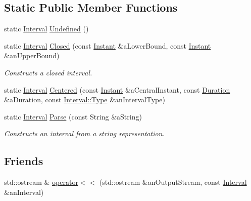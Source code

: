 \subsection*{Static Public Member Functions}
\begin{DoxyCompactItemize}
\item 
static \hyperlink{classostk_1_1physics_1_1time_1_1_interval}{Interval} \hyperlink{classostk_1_1physics_1_1time_1_1_interval_a59ab818046b079fa047a739886d72747}{Undefined} ()
\item 
static \hyperlink{classostk_1_1physics_1_1time_1_1_interval}{Interval} \hyperlink{classostk_1_1physics_1_1time_1_1_interval_aa8d39973df40ac95b27cc460e86e3aa7}{Closed} (const \hyperlink{classostk_1_1physics_1_1time_1_1_instant}{Instant} \&a\+Lower\+Bound, const \hyperlink{classostk_1_1physics_1_1time_1_1_instant}{Instant} \&an\+Upper\+Bound)
\begin{DoxyCompactList}\small\item\em Constructs a closed interval. \end{DoxyCompactList}\item 
static \hyperlink{classostk_1_1physics_1_1time_1_1_interval}{Interval} \hyperlink{classostk_1_1physics_1_1time_1_1_interval_aad7763c91cd880c3a90127d1b147a0fa}{Centered} (const \hyperlink{classostk_1_1physics_1_1time_1_1_instant}{Instant} \&a\+Central\+Instant, const \hyperlink{classostk_1_1physics_1_1time_1_1_duration}{Duration} \&a\+Duration, const \hyperlink{classostk_1_1physics_1_1time_1_1_interval_a7011137ee6d84ebb8705c95d88f87818}{Interval\+::\+Type} \&an\+Interval\+Type)
\item 
static \hyperlink{classostk_1_1physics_1_1time_1_1_interval}{Interval} \hyperlink{classostk_1_1physics_1_1time_1_1_interval_a7905daf5c50e500e5450d56040dc57f4}{Parse} (const String \&a\+String)
\begin{DoxyCompactList}\small\item\em Constructs an interval from a string representation. \end{DoxyCompactList}\end{DoxyCompactItemize}
\subsection*{Friends}
\begin{DoxyCompactItemize}
\item 
std\+::ostream \& \hyperlink{classostk_1_1physics_1_1time_1_1_interval_a4671ce6746f99155561a1bdfade9749a}{operator$<$$<$} (std\+::ostream \&an\+Output\+Stream, const \hyperlink{classostk_1_1physics_1_1time_1_1_interval}{Interval} \&an\+Interval)
\end{DoxyCompactItemize}


